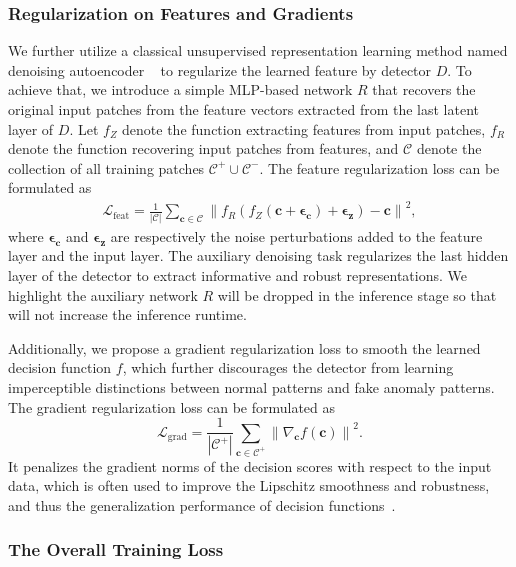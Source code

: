 \documentclass[letterpaper]{article} %
\begin{document}
\subsubsection{Regularization on Features and Gradients}
We further utilize a classical unsupervised representation learning method named denoising autoencoder ~\cite{DAE} to regularize the learned feature by detector $D$. To achieve that, we introduce a simple MLP-based network $R$ that recovers the original input patches from the feature vectors extracted from the last latent layer of $D$. Let $f_{Z}$ denote the function extracting features from input patches, $f_{R}$ denote the function recovering input patches from features, and $\mathcal{C}$ denote the collection of all training patches $\mathcal{C}^+\!\cup\!\mathcal{C}^-$. The feature regularization loss can be formulated as
\begin{equation}
    \begin{aligned}
	    \mathcal{L}_{\mathrm{feat}}= \frac{1}{|\mathcal{C}|}\sum_{\bm{c}\in \mathcal{C}} \left\|f_{R}(f_{Z}(\bm{c}+\bm{\epsilon_c})+\bm{\epsilon_z}) - \bm{c}\right\|^2,
     \end{aligned}
\end{equation}
where $\bm{\epsilon_c}$ and $\bm{\epsilon_z}$ are respectively the noise perturbations added to the feature layer and the input layer. The auxiliary denoising task regularizes the last hidden layer of the detector to extract informative and robust representations. We highlight the auxiliary network $R$ will be dropped in the inference stage so that will not increase the inference runtime.

Additionally, we propose a gradient regularization loss to smooth the learned decision function $f$, which further discourages the detector from learning imperceptible distinctions between normal patterns and fake anomaly patterns. The gradient regularization loss can be formulated as
\begin{equation}
    \mathcal{L}_{\mathrm{grad}}=\frac{1}{|\mathcal{C}^+|}\sum_{\bm{c}\in \mathcal{C}^+} \left\|\nabla_{\bm{c}} f(\bm{c})\right\|^{2}.
    \label{eq_gp}
\end{equation}
It penalizes the gradient norms of the decision scores with respect to the input data, which is often used to improve the Lipschitz smoothness and robustness, and thus the generalization performance of decision functions~\cite{GradPU, arjovsky2017towards,inputGrad}.
\subsubsection{The Overall Training Loss}
\end{document}
